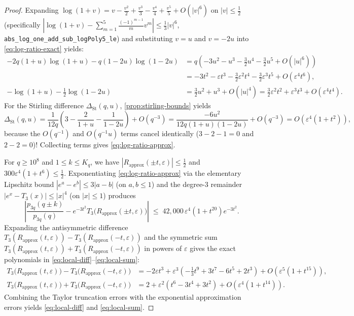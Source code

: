 \documentclass[11pt,a4paper]{article}
\numberwithin{equation}{section}
\theoremstyle{plain}
\theoremstyle{definition}
\theoremstyle{remark}
\newcommand{\code}[1]{\texttt{\small #1}}
\begin{document}
\begin{proof}
Expanding $\log(1+v)=v-\frac{v^2}{2}+\frac{v^3}{3}-\frac{v^4}{4}+\frac{v^5}{5}+O(|v|^6)$ on $|v|\le\frac{1}{2}$ (specifically $|\log(1+v)-\sum_{m=1}^{5}\frac{(-1)^{m-1}}{m}v^m|\le \frac{1}{3}|v|^6$, \code{abs\_log\_one\_add\_sub\_logPoly5\_le}) and substituting $v=u$ and $v=-2u$ into \eqref{eq:log-ratio-exact} yields:
\begin{align*}
  -2q(1+u)\log(1+u) - q(1-2u)\log(1-2u)
  &= q\left(-3u^2 - u^3 - \frac{3}{2}u^4 - \frac{3}{2}u^5 + O(|u|^6)\right)\\
  &= -3t^2 - \varepsilon t^3 - \frac{3}{2}\varepsilon^2 t^4 - \frac{3}{2}\varepsilon^3 t^5 + O(\varepsilon^4 t^6),\\
  -\log(1+u) - \frac{1}{2}\log(1-2u)
  &= \frac{3}{2}u^2 + u^3 + O(|u|^4)
   = \frac{3}{2}\varepsilon^2 t^2 + \varepsilon^3 t^3 + O(\varepsilon^4 t^4).
\end{align*}
For the Stirling difference $\Delta_{\mathrm{St}}(q,u)$, \cref{prop:stirling-bounds} yields
\[
  \Delta_{\mathrm{St}}(q,u)
  = \frac{1}{12q}\left(3 - \frac{2}{1+u} - \frac{1}{1-2u}\right) + O(q^{-3})
  = \frac{-6u^2}{12q(1+u)(1-2u)} + O(q^{-3})
  = O(\varepsilon^4(1+t^2)),
\]
because the $O(q^{-1})$ and $O(q^{-1}u)$ terms cancel identically ($3-2-1=0$ and $2-2=0$)! Collecting terms gives \eqref{eq:log-ratio-approx}.

For $q\ge 10^8$ and $1\le k\le K_q$, we have $|R_{\mathrm{approx}}(\pm t,\varepsilon)|\le \frac{1}{2}$ and $300\varepsilon^4(1+t^6)\le \frac{1}{2}$. Exponentiating \eqref{eq:log-ratio-approx} via the elementary Lipschitz bound $|e^a-e^b|\le 3|a-b|$ (on $a,b\le 1$) and the degree-$3$ remainder $|e^x-T_3(x)|\le |x|^4$ (on $|x|\le 1$) produces
\[
  \left|\frac{p_{3q}(q\pm k)}{p_{3q}(q)} - e^{-3t^2}T_3\bigl(R_{\mathrm{approx}}(\pm t,\varepsilon)\bigr)\right|
  \;\le\; 42{,}000\,\varepsilon^4(1+t^{20})e^{-3t^2}.
\]
Expanding the antisymmetric difference $T_3(R_{\mathrm{approx}}(t,\varepsilon))-T_3(R_{\mathrm{approx}}(-t,\varepsilon))$ and the symmetric sum $T_3(R_{\mathrm{approx}}(t,\varepsilon))+T_3(R_{\mathrm{approx}}(-t,\varepsilon))$ in powers of $\varepsilon$ gives the exact polynomials in \eqref{eq:local-diff}--\eqref{eq:local-sum}:
\begin{align*}
  T_3\bigl(R_{\mathrm{approx}}(t,\varepsilon)\bigr) - T_3\bigl(R_{\mathrm{approx}}(-t,\varepsilon)\bigr)
  &= -2\varepsilon t^3 + \varepsilon^3\!\left(-\frac{1}{3}t^9 + 3t^7 - 6t^5 + 2t^3\right) + O(\varepsilon^5(1+t^{15})),\\
  T_3\bigl(R_{\mathrm{approx}}(t,\varepsilon)\bigr) + T_3\bigl(R_{\mathrm{approx}}(-t,\varepsilon)\bigr)
  &= 2 + \varepsilon^2\!\left(t^6 - 3t^4 + 3t^2\right) + O(\varepsilon^4(1+t^{14})).
\end{align*}
Combining the Taylor truncation errors with the exponential approximation errors yields \eqref{eq:local-diff} and \eqref{eq:local-sum}.
\end{proof}
\end{document}
